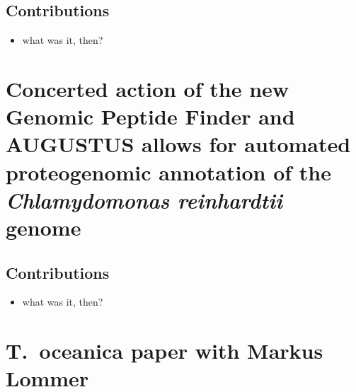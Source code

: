 \documentclass[11pt,a4paper,twoside]{report}
\newcommand{\includepublication}[1]{}
\begin{document}
\subsection*{Contributions}

\begin{itemize}
\item what was it, then?
\end{itemize}

\includepublication{publications/terashima-2011-ms.pdf}

\cleardoublepage
\section{Concerted action of the new Genomic Peptide Finder and AUGUSTUS allows for automated proteogenomic annotation of the {\em Chlamydomonas reinhardtii} genome}

\subsection*{Contributions}

\begin{itemize}
\item what was it, then?
\end{itemize}

\includepublication{publications/gpf-2011.pdf}

\cleardoublepage
\section{T.~oceanica paper with Markus Lommer}
\end{document}
